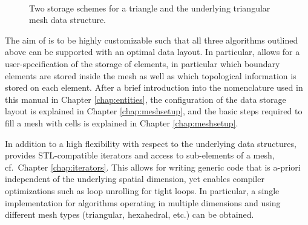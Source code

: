 \begin{figure}[bt]
 \centering
\mbox{
 \hspace{0.5cm}
 }
 \caption{Two storage schemes for a triangle and the underlying triangular mesh data structure.}
 \label{fig:storage-schemes-triangle}
\end{figure}

The aim of {\ViennaGrid} is to be highly customizable such that all three algorithms outlined above can be supported with an optimal data layout.
In particular, {\ViennaGrid} allows for a user-specification of the storage of elements, in particular which boundary elements are stored inside the mesh as well as which topological information is stored on each element.
After a brief introduction into the nomenclature used in this manual in Chapter \ref{chap:entities}, the configuration of the data storage layout is explained in Chapter \ref{chap:meshsetup}, and the basic steps required to fill a mesh with cells is explained in Chapter \ref{chap:meshsetup}.

In addition to a high flexibility with respect to the underlying data structures, {\ViennaGrid} provides STL-compatible iterators and access to sub-elements of a mesh, cf.~Chapter \ref{chap:iterators}.
This allows for writing generic code that is a-priori independent of the underlying spatial dimension, yet enables compiler optimizations such as loop unrolling for tight loops.
In particular, a single implementation for algorithms operating in multiple dimensions and using different mesh types (triangular, hexahedral, etc.) can be obtained.

